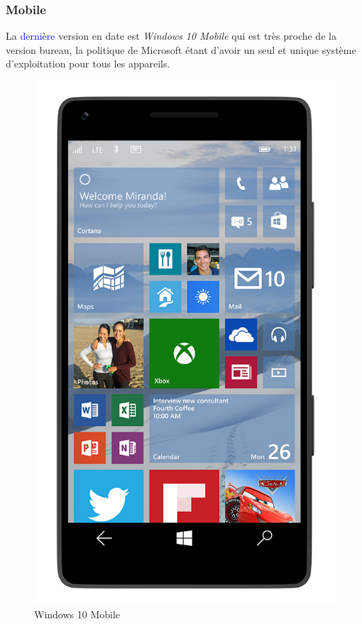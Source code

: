 \documentclass[aspectratio=169]{beamer}
\begin{document}
\begin{frame}
  \frametitle{Mobile}
  La \textcolor{blue}{dernière} version en date est \textit{Windows 10 Mobile} qui est
  très proche de la version bureau, la politique de Microsoft étant d'avoir un
  seul et unique système d'exploitation pour tous les appareils.

    \begin{figure}[!h]
    \centering
    \includegraphics[scale=0.22]
    {textures/images/windows/Windows10Mobile.png}
    \caption{Windows 10 Mobile}
  \end{figure}
\end{frame}
\end{document}
